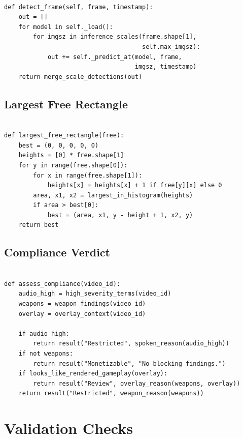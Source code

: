 \documentclass[12pt,a4paper,twoside]{report}
\begin{document}
\begin{verbatim}

def detect_frame(self, frame, timestamp):
    out = []
    for model in self._load():
        for imgsz in inference_scales(frame.shape[1],
                                      self.max_imgsz):
            out += self._predict_at(model, frame,
                                    imgsz, timestamp)
    return merge_scale_detections(out)

\end{verbatim}

\subsection{Largest Free Rectangle}

\begin{verbatim}

def largest_free_rectangle(free):
    best = (0, 0, 0, 0, 0)
    heights = [0] * free.shape[1]
    for y in range(free.shape[0]):
        for x in range(free.shape[1]):
            heights[x] = heights[x] + 1 if free[y][x] else 0
        area, x1, x2 = largest_in_histogram(heights)
        if area > best[0]:
            best = (area, x1, y - height + 1, x2, y)
    return best

\end{verbatim}

\subsection{Compliance Verdict}

\begin{verbatim}

def assess_compliance(video_id):
    audio_high = high_severity_terms(video_id)
    weapons = weapon_findings(video_id)
    overlay = overlay_context(video_id)

    if audio_high:
        return result("Restricted", spoken_reason(audio_high))
    if not weapons:
        return result("Monetizable", "No blocking findings.")
    if looks_like_rendered_gameplay(overlay):
        return result("Review", overlay_reason(weapons, overlay))
    return result("Restricted", weapon_reason(weapons))

\end{verbatim}

\section{Validation Checks}
\end{document}
